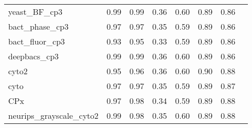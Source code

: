 \documentclass[./dissertation.tex]{subfiles}
\begin{document}
\begin{table}
\begin{tabular}{|l|c|c|c|c|c|c|c|}
        yeast\_BF\_cp3                           & 0.99                                 & 0.99                                  & 0.36                                   & 0.60                                    & 0.89                                   & 0.86                                     \\
        bact\_phase\_cp3                         & 0.97                                 & 0.97                                  & 0.35                                   & 0.59                                    & 0.89                                   & 0.86                                     \\
        bact\_fluor\_cp3                         & 0.93                                 & 0.95                                  & 0.33                                   & 0.59                                    & 0.89                                   & 0.86                                     \\
        deepbacs\_cp3                            & 0.99                                 & 0.99                                  & 0.36                                   & 0.60                                    & 0.89                                   & 0.86                                     \\
        cyto2                                    & 0.95                                 & 0.96                                  & 0.36                                   & 0.60                                    & 0.90                                   & 0.88                                     \\
        cyto                                     & 0.97                                 & 0.97                                  & 0.35                                   & 0.59                                    & 0.89                                   & 0.87                                     \\
        CPx                                      & 0.97                                 & 0.98                                  & 0.34                                   & 0.59                                    & 0.89                                   & 0.88                                     \\
        neurips\_grayscale\_cyto2                & 0.99                                 & 0.98                                  & 0.35                                   & 0.60                                    & 0.89                                   & 0.88                                     \\

\end{tabular}
\end{table}
\end{document}
